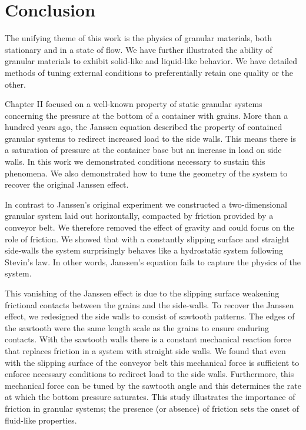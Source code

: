 \chapter{Conclusion}

The unifying theme of this work is the physics of granular materials, both stationary and in a state of flow. We have further illustrated the ability of granular materials to exhibit solid-like and liquid-like behavior. We have detailed methods of tuning external conditions to preferentially retain one quality or the other. 

Chapter II focused on a well-known property of static granular systems concerning the pressure at the bottom of a container with grains. More than a hundred years ago, the Janssen equation described the property of contained granular systems to redirect increased load to the side walls. This means there is a saturation of pressure at the container base but an increase in load on side walls. In this work we demonstrated conditions necessary to sustain this phenomena. We also demonstrated how to tune the geometry of the system to recover the original Janssen effect. 

In contrast to Janssen's original experiment we constructed a two-dimensional granular system laid out horizontally, compacted by friction provided by a conveyor belt. We therefore removed the effect of gravity and could focus on the role of friction. We showed that with a constantly slipping surface and straight side-walls the system surprisingly behaves like a hydrostatic system following Stevin's law. In other words, Janssen's equation fails to capture the physics of the system. 

This vanishing of the Janssen effect is due to the slipping surface weakening frictional contacts between the grains and the side-walls. To recover the Janssen effect, we redesigned the side walls to consist of sawtooth patterns. The edges of the sawtooth were the same length scale as the grains to ensure enduring contacts. With the sawtooth walls there is a constant mechanical reaction force that replaces friction in a system with straight side walls. We found that even with the slipping surface of the conveyor belt this mechanical force is sufficient to enforce necessary conditions to redirect load to the side walls. Furthermore, this mechanical force can be tuned by the sawtooth angle and this determines the rate at which the bottom pressure saturates. This study illustrates the importance of friction in granular systems; the presence (or absence) of friction sets the onset of fluid-like properties. 

